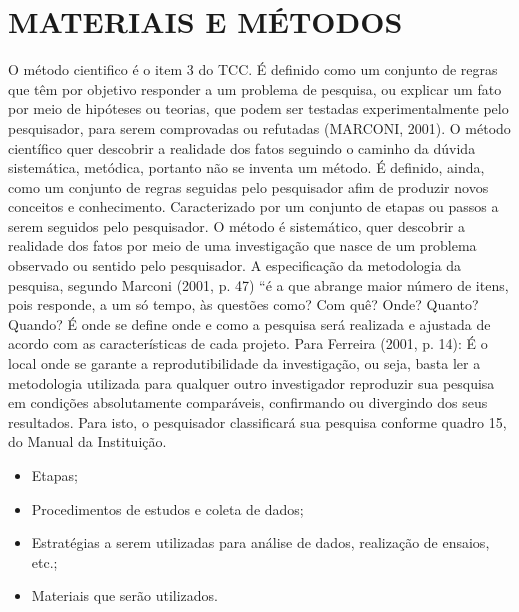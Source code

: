 \chapter{MATERIAIS E MÉTODOS}
\label{materiaisemetodos}

O método cientifico é o item 3 do TCC. É definido como um conjunto de regras que têm por objetivo responder a um problema de pesquisa, ou explicar um fato por meio de hipóteses ou teorias, que podem ser testadas experimentalmente pelo pesquisador, para serem comprovadas ou refutadas (MARCONI, 2001).
O método científico quer descobrir a realidade dos fatos seguindo o caminho da dúvida sistemática, metódica, portanto não se inventa um método. É definido, ainda, como um conjunto de regras seguidas pelo pesquisador afim de produzir novos conceitos e conhecimento. Caracterizado por um conjunto de etapas ou passos a serem seguidos pelo pesquisador.
O método é sistemático, quer descobrir a realidade dos fatos por meio de uma investigação que nasce de um problema observado ou sentido pelo pesquisador. A especificação da metodologia da pesquisa, segundo Marconi (2001, p. 47) “é a que abrange maior número de itens, pois responde, a um só tempo, às questões como? Com quê? Onde? Quanto? Quando? É onde se define onde e como a pesquisa será realizada e ajustada de acordo com as características de cada projeto. Para Ferreira (2001, p. 14): É o local onde se garante a reprodutibilidade da investigação, ou seja, basta ler a metodologia utilizada para qualquer outro investigador reproduzir sua pesquisa em condições absolutamente comparáveis, confirmando ou divergindo dos seus resultados. Para isto, o pesquisador classificará sua pesquisa conforme quadro 15, do Manual da Instituição.

\begin{itemize}
    \item Etapas;
    \item Procedimentos de estudos e coleta de dados;   
    \item Estratégias a serem utilizadas para análise de dados, realização de ensaios, etc.;
		\item Materiais que serão utilizados.
\end{itemize}